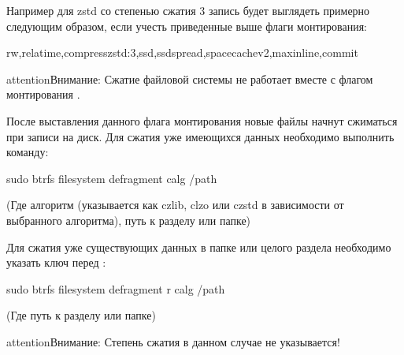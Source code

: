 \documentclass[letterpaper,10pt,russian,openany]{sphinxmanual}
\begin{document}
\sphinxAtStartPar
Например для zstd со степенью сжатия 3 запись будет выглядеть примерно следующим образом, если учесть приведенные выше флаги монтирования:

\begin{sphinxVerbatim}[commandchars=\\\{\}]
rw,relatime,compresszstd:3,ssd,ssd\PYGZus{}spread,space\PYGZus{}cachev2,max\PYGZus{}inline,commit
\end{sphinxVerbatim}

\begin{sphinxadmonition}{attention}{Внимание:}
\sphinxAtStartPar
Сжатие файловой системы не работает вместе с флагом монтирования .
\end{sphinxadmonition}

\sphinxAtStartPar
После выставления данного флага монтирования новые файлы начнут сжиматься при записи на диск. Для сжатия уже имеющихся данных необходимо выполнить команду:

\begin{sphinxVerbatim}[commandchars=\\\{\}]
sudo btrfs filesystem defragment \PYGZhy{}calg /path
\end{sphinxVerbatim}

\sphinxAtStartPar
(Где  \sphinxhyphen{} алгоритм (указывается как czlib, clzo или czstd в зависимости от выбранного алгоритма),  \sphinxhyphen{} путь к разделу или папке)

\sphinxAtStartPar
Для сжатия уже существующих данных в папке или целого раздела необходимо указать ключ  перед :

\begin{sphinxVerbatim}[commandchars=\\\{\}]
sudo btrfs filesystem defragment \PYGZhy{}r \PYGZhy{}calg /path
\end{sphinxVerbatim}

\sphinxAtStartPar
(Где  \sphinxhyphen{} путь к разделу или папке)

\begin{sphinxadmonition}{attention}{Внимание:}
\sphinxAtStartPar
Степень сжатия в данном случае не указывается!
\end{sphinxadmonition}
\end{document}
